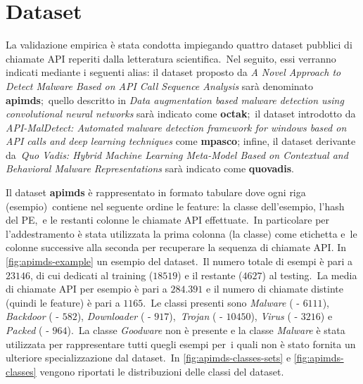\newcommand{\datasetapimds}{\textit{A Novel Approach to Detect Malware Based on API Call Sequence Analysis}}
\newcommand{\datasetoctak}{\textit{Data augmentation based malware detection using convolutional neural networks}}
\newcommand{\datasetmpasco}{\textit{API-MalDetect: Automated malware detection framework for windows based on API calls and deep learning techniques}}
\newcommand{\datasetquovaids}{\textit{Quo Vadis: Hybrid Machine Learning Meta-Model Based on Contextual and Behavioral Malware Representations}}
\newcommand{\clsper}[3]{\textit{#1} (\percc{#2} - $#3$)}
\section{Dataset}

La validazione empirica è stata condotta impiegando quattro dataset pubblici di chiamate API reperiti dalla letteratura scientifica.\
Nel seguito, essi verranno indicati mediante i seguenti alias: il dataset proposto da \datasetapimds{} sarà denominato \textbf{apimds};\
quello descritto in \datasetoctak{} sarà indicato come \textbf{octak};\
il dataset introdotto da \datasetmpasco{} come \textbf{mpasco}; infine, il dataset derivante da\
\datasetquovaids{} sarà indicato come \textbf{quovadis}.

Il dataset \textbf{apimds} è rappresentato in formato tabulare dove ogni riga (esempio)\
contiene nel seguente ordine le feature: la classe dell'esempio, l'hash del PE,\
e le restanti colonne le chiamate API effettuate.\
In particolare per l'addestramento è stata utilizzata la prima colonna (la classe) come etichetta e\
le colonne successive alla seconda per recuperare la sequenza di chiamate API.
In \autoref{fig:apimds-example} un esempio del dataset.\
Il numero totale di esempi è pari a $23146$, di cui  dedicati al training ($18519$) e il restante ($4627$) al testing.\
La media di chiamate API per esempio è pari a $284.391$ e il numero di chiamate distinte (quindi le feature) è pari a $1165$.\
Le classi presenti sono \clsper{Malware}{27.4}{6111}, \clsper{Backdoor}{2.6}{582}, \clsper{Downloader}{4,1}{917},\
\clsper{Trojan}{46.9}{10450}, \clsper{Virus}{14.6}{3216} e \clsper{Packed}{4.3}{964}.\
La classe \textit{Goodware} non è presente e la classe \textit{Malware} è stata utilizzata per rappresentare tutti quegli esempi per\
i quali non è stato fornita un ulteriore specializzazione dal dataset.\
In \autoref{fig:apimds-classes-sets} e \autoref{fig:apimds-classes} vengono riportati le distribuzioni delle classi del dataset.\

